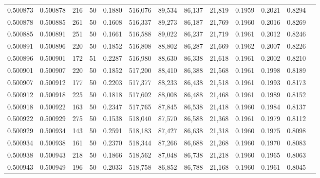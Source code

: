 \begin{tabular}{rrrrrrrrrrrrr}
0.500873 & 0.500878 & 216 &  50 &                                     0.1880 & 516,076 &  89,534 &  86,137 &  21,819 & 0.1959 & 0.2021 & 0.8294 \\
0.500878 & 0.500885 & 261 &  50 &                                     0.1608 & 516,337 &  89,273 &  86,187 &  21,769 & 0.1960 & 0.2016 & 0.8269 \\
0.500885 & 0.500891 & 251 &  50 &                                     0.1661 & 516,588 &  89,022 &  86,237 &  21,719 & 0.1961 & 0.2012 & 0.8246 \\
0.500891 & 0.500896 & 220 &  50 &                                     0.1852 & 516,808 &  88,802 &  86,287 &  21,669 & 0.1962 & 0.2007 & 0.8226 \\
0.500896 & 0.500901 & 172 &  51 &                                     0.2287 & 516,980 &  88,630 &  86,338 &  21,618 & 0.1961 & 0.2002 & 0.8210 \\
0.500901 & 0.500907 & 220 &  50 &                                     0.1852 & 517,200 &  88,410 &  86,388 &  21,568 & 0.1961 & 0.1998 & 0.8189 \\
0.500907 & 0.500912 & 177 &  50 &                                     0.2203 & 517,377 &  88,233 &  86,438 &  21,518 & 0.1961 & 0.1993 & 0.8173 \\
0.500912 & 0.500918 & 225 &  50 &                                     0.1818 & 517,602 &  88,008 &  86,488 &  21,468 & 0.1961 & 0.1989 & 0.8152 \\
0.500918 & 0.500922 & 163 &  50 &                                     0.2347 & 517,765 &  87,845 &  86,538 &  21,418 & 0.1960 & 0.1984 & 0.8137 \\
0.500922 & 0.500929 & 275 &  50 &                                     0.1538 & 518,040 &  87,570 &  86,588 &  21,368 & 0.1961 & 0.1979 & 0.8112 \\
0.500929 & 0.500934 & 143 &  50 &                                     0.2591 & 518,183 &  87,427 &  86,638 &  21,318 & 0.1960 & 0.1975 & 0.8098 \\
0.500934 & 0.500938 & 161 &  50 &                                     0.2370 & 518,344 &  87,266 &  86,688 &  21,268 & 0.1960 & 0.1970 & 0.8083 \\
0.500938 & 0.500943 & 218 &  50 &                                     0.1866 & 518,562 &  87,048 &  86,738 &  21,218 & 0.1960 & 0.1965 & 0.8063 \\
0.500943 & 0.500949 & 196 &  50 &                                     0.2033 & 518,758 &  86,852 &  86,788 &  21,168 & 0.1960 & 0.1961 & 0.8045 \\

\end{tabular}
